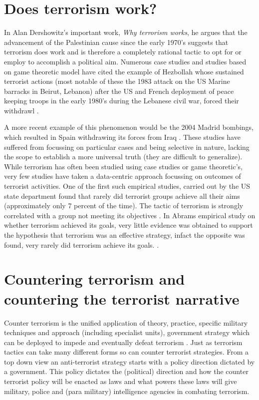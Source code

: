 \section{Does terrorism work?}
In Alan Dershowitz's important work, \textit{Why terrorism works}, he argues that the advancement of the Palestinian cause since the early 1970's \citep{dershowitz2002terrorism} suggests that terrorism does work and is therefore a completely rational tactic to opt for or employ to accomplish a political aim.  Numerous case studies and studies based on game theoretic model have cited the example of Hezbollah whose sustained terrorist actions (most notable of these the 1983 attack on the US Marine barracks in Beirut, Lebanon) after the US and French deployment of peace keeping troops in the early 1980's during the Lebanese civil war, forced their withdrawl \citep{atran2004trends}. 

A more recent example of this phenomenon would be the 2004 Madrid bombings, which resulted in Spain withdrawing its forces from Iraq \citep{rose2007does}. These studies have suffered from focussing on particular cases and being selective in nature, lacking the scope to establish a more universal truth (they are difficult to generalize).
\\
While terrorism has often been studied using case studies or game theoretic's, very few studies have taken a data-centric approach focussing on outcomes of terrorist activities. One of the first such empirical studies, carried out by the US state department found that rarely did terrorist groups achieve all their aims (approximately only 7 percent of the time). The tactic of terrorism is strongly correlated with a group not meeting its objectives \citep{cronin2004foreign}. In Abrams empirical study on whether terrorism achieved its goals, very little evidence was obtained to support the hypothesis that terrorism was an effective strategy, infact the opposite was found, very rarely did terrorism achieve its goals. \citep{abrahms2006terrorism}.

\section{Countering terrorism and countering the terrorist narrative}

Counter terrorism is the unified application of theory, practice, specific military techniques and approach (including specialist units), government strategy which can be deployed to impede and eventually defeat terrorism \citep{jackson2005writing}. Just as terrorism tactics can take many different forms so can counter terrorist strategies. From a top down view an anti-terrorist strategy starts with a policy direction dictated by a government. This policy dictates the (political) direction and how the counter terrorist policy will be enacted as laws and what powers these laws will give military, police and (para military) intelligence agencies in combating terrorism. 

